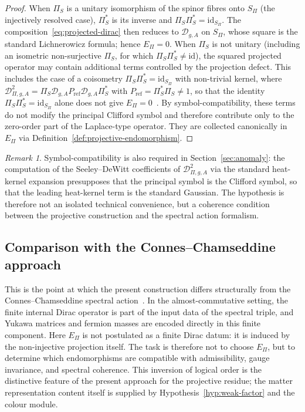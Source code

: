 \documentclass[11pt,a4paper]{article}
\theoremstyle{definition}
\theoremstyle{remark}
\newtheorem{remark}[theorem]{Remark}
\begin{document}
    \begin{proof}
      When $\Pi_S$ is a unitary isomorphism of the spinor fibres onto $S_\Pi$ (the injectively resolved case),
      $\Pi_S^*$ is its inverse and $\Pi_S \Pi_S^* = \mathrm{id}_{S_\Pi}$.
      The composition~\eqref{eq:projected-dirac} then reduces to $\mathcal{D}_{g,A}$
      on $S_\Pi$, whose square is the standard Lichnerowicz formula; hence $E_\Pi = 0$.
      When $\Pi_S$ is not unitary (including an isometric non-surjective $\Pi_S$, for which $\Pi_S\Pi_S^* \neq \mathrm{id}$),
      the squared projected operator may contain additional terms controlled by the projection defect.
      This includes the case of a coisometry $\Pi_S \Pi_S^* = \mathrm{id}_{S_\Pi}$ with non-trivial kernel,
      where $\mathcal{D}_{\Pi,g,A}^2 = \Pi_S \mathcal{D}_{g,A} P_{\mathrm{ref}} \mathcal{D}_{g,A} \Pi_S^*$ with
      $P_{\mathrm{ref}} = \Pi_S^*\Pi_S \neq 1$, so that the identity $\Pi_S \Pi_S^* = \mathrm{id}_{S_\Pi}$ alone does not
      give $E_\Pi = 0$~\cite{Beau2026prs}.
      By symbol-compatibility, these terms do not modify the principal Clifford symbol
      and therefore contribute only to the zero-order part of the Laplace-type operator.
      They are collected canonically in $E_\Pi$ via
      Definition~\ref{def:projective-endomorphism}.
    \end{proof}

    \begin{remark}
      \label{rem:symbol-compatibility-seeley-dewitt}
      Symbol-compatibility is also required in Section~\ref{sec:anomaly}: the computation
      of the Seeley--DeWitt coefficients of $\mathcal{D}_{\Pi,g,A}^2$ via the standard
      heat-kernel expansion presupposes that the principal symbol is the Clifford symbol,
      so that the leading heat-kernel term is the standard Gaussian.
      The hypothesis is therefore not an isolated technical convenience, but a coherence
      condition between the projective construction and the spectral action formalism.
    \end{remark}

  \subsection{Comparison with the Connes--Chamseddine approach}
    \label{ssec:comparison-cc}

    This is the point at which the present construction differs structurally from the
    Connes--Chamseddine spectral action~\cite{ConnesChamseddine1997}.
    In the almost-commutative setting, the finite internal Dirac operator is part of
    the input data of the spectral triple, and Yukawa matrices and fermion masses are
    encoded directly in this finite component.
    Here $E_\Pi$ is not postulated as a finite Dirac datum: it is induced by the
    non-injective projection itself.
    The task is therefore not to choose $E_\Pi$, but to determine which endomorphisms
    are compatible with admissibility, gauge invariance, and spectral coherence.
    This inversion of logical order is the distinctive feature of the present approach for the
    projective residue; the matter representation content itself is supplied by
    Hypothesis~\ref{hyp:weak-factor} and the colour module.
\end{document}
